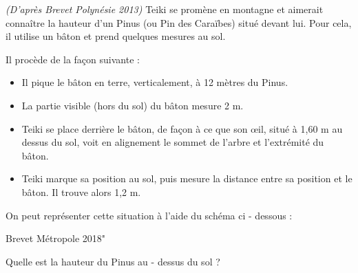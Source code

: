 
\textit{(D'après Brevet Polynésie 2013)}
\medskip
Teiki se promène en montagne et aimerait connaître la hauteur d'un Pinus (ou Pin des Caraïbes) situé devant lui. Pour cela, il utilise un bâton et prend quelques mesures au sol.
\par
Il procède de la façon suivante :
\begin{itemize}
     \item Il pique le bâton en terre, verticalement, à 12 mètres du Pinus.
     \item La partie visible (hors du sol) du bâton mesure 2 m.
     \item Teiki se place derrière le bâton, de façon à ce que son œil, situé à 1,60 m au dessus du sol, voit en alignement le sommet de l'arbre et l'extrémité du bâton.
     \item Teiki marque sa position au sol, puis mesure la distance entre sa position et le bâton. Il trouve alors 1,2 m.
\end{itemize}
On peut représenter cette situation à l'aide du schéma ci - dessous :
\begin{center}
     Brevet Métropole 2018"
\end{center}
Quelle est la hauteur du Pinus au - dessus du sol ?
%
